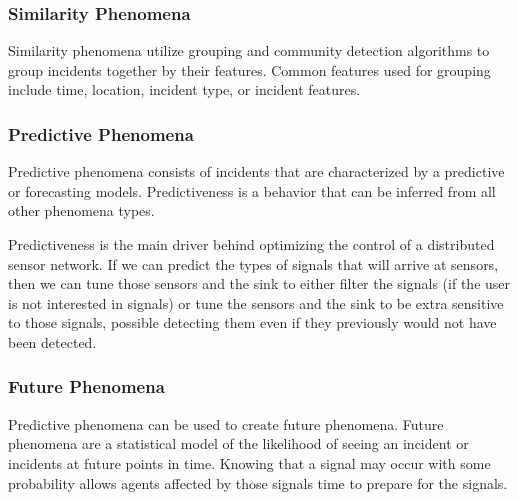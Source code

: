 \subsubsection{Similarity Phenomena}
Similarity phenomena utilize grouping and community detection algorithms to group incidents together by their features. Common features used for grouping include time, location, incident type, or incident features.


\subsubsection{Predictive Phenomena}
Predictive phenomena consists of incidents that are characterized by a predictive or forecasting models. Predictiveness is a behavior that can be inferred from all other phenomena types. 

Predictiveness is the main driver behind optimizing the control of a distributed sensor network. If we can predict the types of signals that will arrive at sensors, then we can tune those sensors and the sink to either filter the signals (if the user is not interested in signals) or tune the sensors and the sink to be extra sensitive to those signals, possible detecting them even if they previously would not have been detected.

\subsubsection{Future Phenomena}
Predictive phenomena can be used to create future phenomena. Future phenomena are a statistical model of the likelihood of seeing an incident or incidents at future points in time. Knowing that a signal may occur with some probability allows agents affected by those signals time to prepare for the signals.
